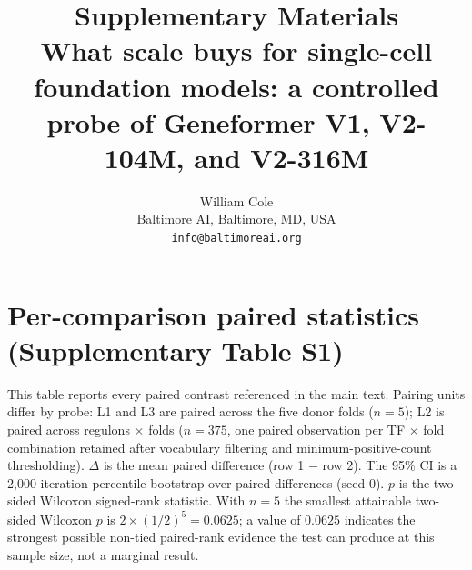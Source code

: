 \documentclass[11pt]{article}
\title{\textbf{Supplementary Materials} \\[6pt]
{\large What scale buys for single-cell foundation models: a controlled probe of Geneformer V1, V2-104M, and V2-316M}}
\author{William Cole \\[2pt]
{\small Baltimore AI, Baltimore, MD, USA} \\
{\small\texttt{info@baltimoreai.org}}}
\date{}
\begin{document}
\maketitle

\section{Per-comparison paired statistics (Supplementary Table S1)}

This table reports every paired contrast referenced in the main text. Pairing units differ by probe: L1 and L3 are paired across the five donor folds (\(n=5\)); L2 is paired across regulons \(\times\) folds (\(n=375\), one paired observation per TF \(\times\) fold combination retained after vocabulary filtering and minimum-positive-count thresholding). \(\Delta\) is the mean paired difference (row 1 \(-\) row 2). The 95\% CI is a 2{,}000-iteration percentile bootstrap over paired differences (seed 0). \(p\) is the two-sided Wilcoxon signed-rank statistic. With \(n=5\) the smallest attainable two-sided Wilcoxon \(p\) is \(2 \times (1/2)^5 = 0.0625\); a value of \(0.0625\) indicates the strongest possible non-tied paired-rank evidence the test can produce at this sample size, not a marginal result.
\end{document}
